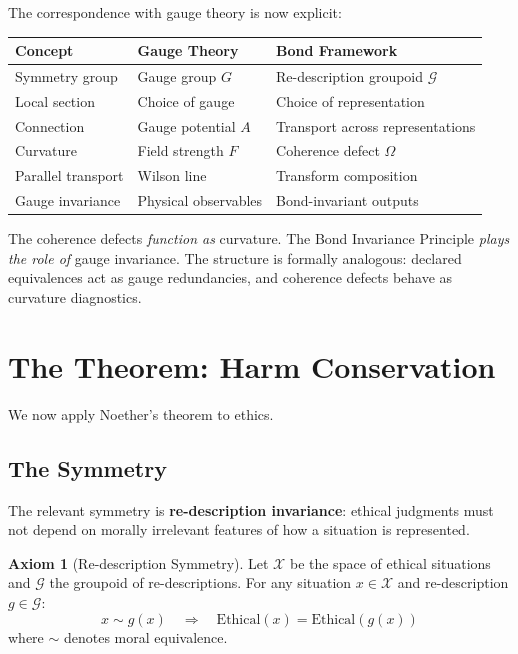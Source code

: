 \documentclass[12pt,letterpaper]{article}
\theoremstyle{definition}
\newtheorem{axiom}{Axiom}
\theoremstyle{remark}
\newcommand{\G}{\mathcal{G}}
\begin{document}
The correspondence with gauge theory is now explicit:

\begin{center}
\begin{tabular}{lll}
\toprule
\textbf{Concept} & \textbf{Gauge Theory} & \textbf{Bond Framework} \\
\midrule
Symmetry group & Gauge group $G$ & Re-description groupoid $\G$ \\
Local section & Choice of gauge & Choice of representation \\
Connection & Gauge potential $A$ & Transport across representations \\
Curvature & Field strength $F$ & Coherence defect $\Omega$ \\
Parallel transport & Wilson line & Transform composition \\
Gauge invariance & Physical observables & Bond-invariant outputs \\
\bottomrule
\end{tabular}
\end{center}

The coherence defects \textit{function as} curvature. The Bond Invariance Principle \textit{plays the role of} gauge invariance. The structure is formally analogous: declared equivalences act as gauge redundancies, and coherence defects behave as curvature diagnostics.

\section{The Theorem: Harm Conservation}

We now apply Noether's theorem to ethics.

\subsection{The Symmetry}

The relevant symmetry is \textbf{re-description invariance}: ethical judgments must not depend on morally irrelevant features of how a situation is represented.

\begin{axiom}[Re-description Symmetry]
Let $\mathcal{X}$ be the space of ethical situations and $\G$ the groupoid of re-descriptions. For any situation $x \in \mathcal{X}$ and re-description $g \in \G$:
\begin{equation}
x \sim g(x) \quad \Rightarrow \quad \text{Ethical}(x) = \text{Ethical}(g(x))
\end{equation}
where $\sim$ denotes moral equivalence.
\end{axiom}
\end{document}
